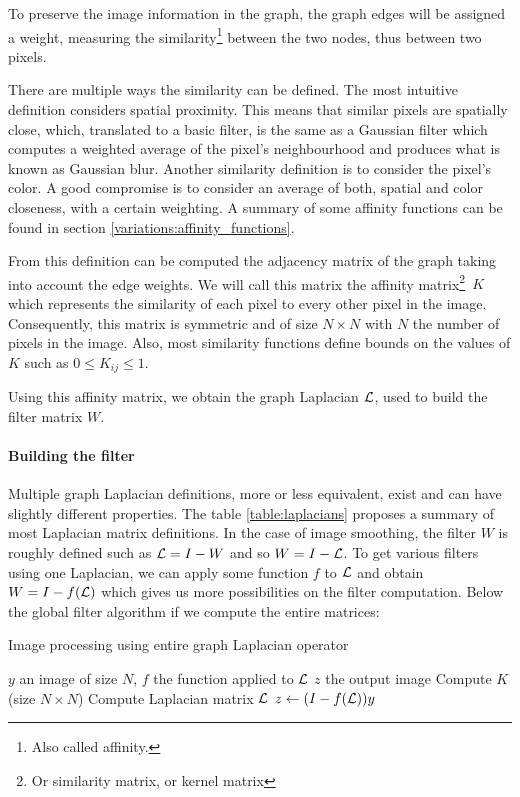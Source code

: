 To preserve the image information in the graph, the graph edges will be assigned a weight, measuring the similarity\footnote{Also called affinity.} between the two nodes, thus between two pixels.

There are multiple ways the similarity can be defined.
The most intuitive definition considers spatial proximity.
This means that similar pixels are spatially close, which, translated to a basic filter, is the same as a Gaussian filter which computes a weighted average of the pixel's neighbourhood and produces what is known as Gaussian blur.
Another similarity definition is to consider the pixel's color.
A good compromise is to consider an average of both, spatial and color closeness, with a certain weighting.
A summary of some affinity functions can be found in section \ref{variations:affinity_functions}.

From this definition can be computed the adjacency matrix of the graph taking into account the edge weights.
We will call this matrix the affinity matrix\footnote{Or similarity matrix, or kernel matrix}\ \(K\) which represents the similarity of each pixel to every other pixel in the image.
Consequently, this matrix is symmetric and of size \(N \times N\) with \(N\) the number of pixels in the image.
Also, most similarity functions define bounds on the values of \(K\) such as \(0 \le K_{ij} \le 1\).

Using this affinity matrix, we obtain the graph Laplacian \(\operatorname{\mathcal{L}}\), used to build the filter matrix \(W\).

\paragraph{Building the filter}

Multiple graph Laplacian definitions, more or less equivalent, exist and can have slightly different properties.
The table \ref{table:laplacians} proposes a summary of most Laplacian matrix definitions.
In the case of image smoothing, the filter \(W\) is roughly defined such as \(\operatorname{\mathcal{L}} = I - W\) \cite{siam_slides_2016} and so \(W = I - \operatorname{\mathcal{L}}\).
To get various filters using one Laplacian, we can apply some function \(f\) to \(\operatorname{\mathcal{L}}\) and obtain \(W = I - f(\operatorname{\mathcal{L}})\) which gives us more possibilities on the filter computation.
Below the global filter algorithm if we compute the entire matrices:

\begin{algorithm}[H]
 \caption{Image processing using entire graph Laplacian operator}
 \begin{algorithmic}
  \REQUIRE \(y\) an image of size \(N\), \(f\) the function applied to \(\operatorname{\mathcal{L}}\)
  \ENSURE \(z\) the output image
  \STATE Compute \(K\) (size \(N \times N\))
  \STATE Compute Laplacian matrix \(\operatorname{\mathcal{L}}\)
  \STATE \(z \leftarrow (I - f(\operatorname{\mathcal{L}})) y\)
 \end{algorithmic}
\end{algorithm}

